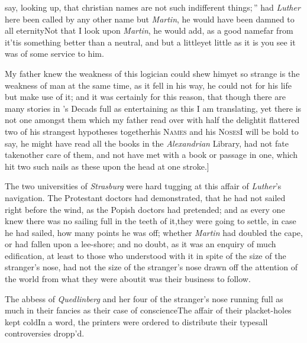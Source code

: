 \documentclass{article}
\begin{document}
\noindent
{}
say, looking up, \lqq that christian names\break
\lqq are not such indifferent things;\,”\tsk\break
had \textit{Luther} here been called by any other name but
\textit{Martin}, he would have been damned to all
eternity\tsk Not that I look upon \textit{Martin}, he would
add, as a good\pb
name\tsk far from it\tsk ’tis something better than a
neutral, and but a little\tsk yet little as it is you see it
was of some service to him.

My father knew the weakness of this
logician could shew him\tsk yet so
strange is the weakness of man at the same time, as it fell in his
way, he could not for his life but make use of it; and it was
certainly for this reason, that though there are many stories in
’s Decads full as entertaining as
this I am translating, yet there is not one amongst them which my
father read over with half the delight\tsk it flattered
two of his strangest hypotheses together\tsk his
\textsc{Names} and his \textsc{Noses}\tsk I
will be bold to say, he might have read all the books in the
\textit{Alexandrian} Library, had not fate taken\pb other care of them,
and not have met with a book or passage in one, which hit two such
nails as these upon the head at one stroke.]

The two universities of \textit{Strasburg} were hard tugging at
this affair of \textit{Luther}’s navigation. The Protestant
doctors had demonstrated, that he had not sailed right before the
wind, as the Popish doctors had pretended; and as every one knew
there was no sailing full in the teeth of it,\tsk they were going
to settle, in case he had sailed, how many points he was off;
whether \textit{Martin} had doubled the cape, or had fallen upon a
lee-shore; and no doubt, as it was an enquiry of much edi\-fication,
at least to those who understood  with it in spite of the
size of the stranger’s nose, had not the size of the
stranger’s nose drawn off the attention of the world from
what they were about\tsk it was their business to
follow.\tsh

The abbess of \textit{Quedlinberg} and her four  of the stranger’s nose running full
as much in their fancies as their case of
conscience\break\tsk The affair of their placket-holes kept
cold\tsk In a word, the printers were ordered to distribute their
types\tsk all controversies dropp’d.
\end{document}

